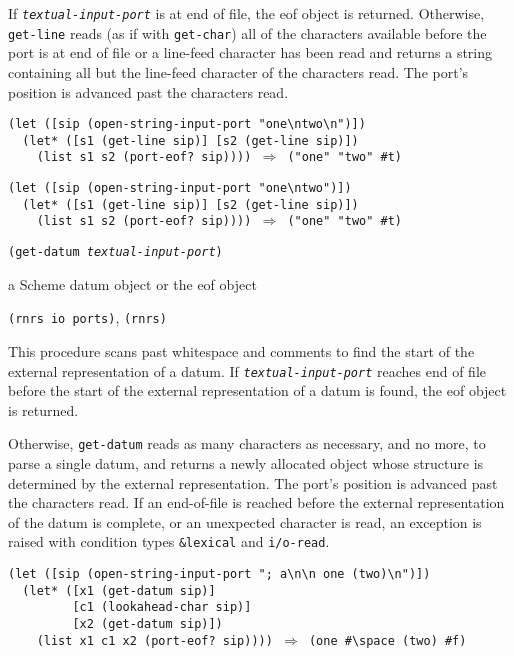 If \texttt{\textit{textual-input-port}} is at end of file, the eof object is returned.
Otherwise, \texttt{get-line} reads (as if with \texttt{get-char})
all of the characters available before the port is at end of file or a
line-feed character has been read and returns a string containing all but
the line-feed character of the characters read.
The port's position is advanced past the characters read.


\begin{alltt}
(let ([sip (open-string-input-port "one\textbackslash{}ntwo\textbackslash{}n")])
  (let* ([s1 (get-line sip)] [s2 (get-line sip)])
    (list s1 s2 (port-eof? sip)))) \(\Rightarrow\) ("one" "two" \#{}t)

(let ([sip (open-string-input-port "one\textbackslash{}ntwo")])
  (let* ([s1 (get-line sip)] [s2 (get-line sip)])
    (list s1 s2 (port-eof? sip)))) \(\Rightarrow\) ("one" "two" \#{}t)
\end{alltt}

\begin{description}

\label{io_s67}\item[procedure] \texttt{(get-datum \textit{textual-input-port})}



\item[returns] a Scheme datum object or the eof object


\item[libraries] \texttt{(rnrs io ports)}, \texttt{(rnrs)}
\end{description}


This procedure scans past whitespace and comments to find the start of
the external representation of a datum.
If \texttt{\textit{textual-input-port}} reaches end of file before the start of the
external representation of a datum is found, the eof object is returned.


Otherwise, \texttt{get-datum} reads as many characters as necessary,
and no more, to parse a single datum, and returns a newly allocated
object whose structure is determined by the external representation.
The port's position is advanced past the characters read.
If an end-of-file is reached before the external representation of
the datum is complete, or an unexpected character is read,
an exception is raised with condition types \texttt{\&{}lexical} and
\texttt{i/o-read}.


\begin{alltt}
(let ([sip (open-string-input-port "; a\textbackslash{}n\textbackslash{}n one (two)\textbackslash{}n")])
  (let* ([x1 (get-datum sip)]
         [c1 (lookahead-char sip)]
         [x2 (get-datum sip)])
    (list x1 c1 x2 (port-eof? sip)))) \(\Rightarrow\) (one \#{}\textbackslash{}space (two) \#{}f)
\end{alltt}

